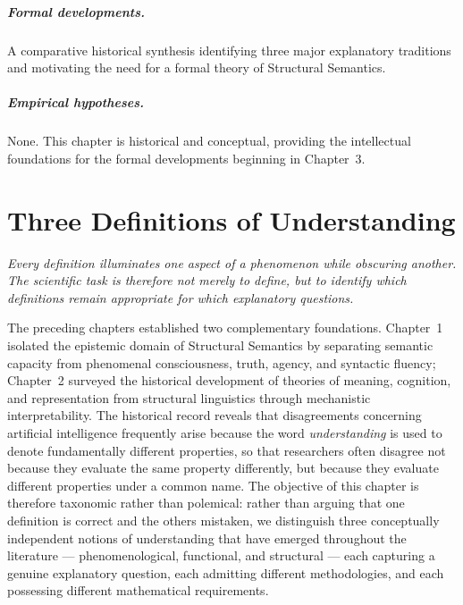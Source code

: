 \documentclass[11pt,twoside,openright]{book}
\numberwithin{equation}{chapter}
\theoremstyle{definition}
\theoremstyle{plain}
\theoremstyle{remark}
\theoremstyle{definition}
\begin{document}
\paragraph{Formal developments.} A comparative historical synthesis
identifying three major explanatory traditions and motivating the need
for a formal theory of Structural Semantics.

\paragraph{Empirical hypotheses.} None. This chapter is historical and
conceptual, providing the intellectual foundations for the formal
developments beginning in Chapter~3.

\chapter{Three Definitions of Understanding}
\label{ch:three-definitions}

\vspace{1em}
\begin{flushright}\itshape
Every definition illuminates one aspect of a phenomenon while obscuring
another. The scientific task is therefore not merely to define, but to
identify which definitions remain appropriate for which explanatory
questions.
\end{flushright}
\vspace{1em}

The preceding chapters established two complementary foundations.
Chapter~1 isolated the epistemic domain of Structural Semantics by
separating semantic capacity from phenomenal consciousness, truth,
agency, and syntactic fluency; Chapter~2 surveyed the historical
development of theories of meaning, cognition, and representation from
structural linguistics through mechanistic interpretability. The
historical record reveals that disagreements concerning artificial
intelligence frequently arise because the word \emph{understanding} is
used to denote fundamentally different properties, so that researchers
often disagree not because they evaluate the same property differently,
but because they evaluate different properties under a common name. The
objective of this chapter is therefore taxonomic rather than polemical:
rather than arguing that one definition is correct and the others
mistaken, we distinguish three conceptually independent notions of
understanding that have emerged throughout the literature ---
phenomenological, functional, and structural --- each capturing a genuine
explanatory question, each admitting different methodologies, and each
possessing different mathematical requirements.
\end{document}
